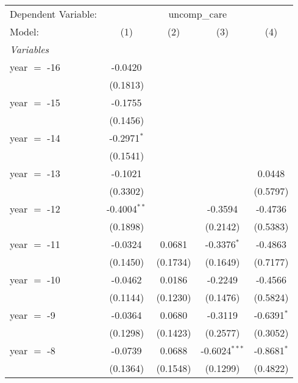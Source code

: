 
\begingroup
\centering
\begin{tabular}{lcccc}
   \tabularnewline \midrule \midrule
   Dependent Variable: & \multicolumn{4}{c}{uncomp\_care}\\
   Model:       & (1)             & (2)             & (3)             & (4)\\  
   \midrule
   \emph{Variables}\\
   year $=$ -16 & -0.0420         &                 &                 &   \\   
                & (0.1813)        &                 &                 &   \\   
   year $=$ -15 & -0.1755         &                 &                 &   \\   
                & (0.1456)        &                 &                 &   \\   
   year $=$ -14 & -0.2971$^{*}$   &                 &                 &   \\   
                & (0.1541)        &                 &                 &   \\   
   year $=$ -13 & -0.1021         &                 &                 & 0.0448\\   
                & (0.3302)        &                 &                 & (0.5797)\\   
   year $=$ -12 & -0.4004$^{**}$  &                 & -0.3594         & -0.4736\\   
                & (0.1898)        &                 & (0.2142)        & (0.5383)\\   
   year $=$ -11 & -0.0324         & 0.0681          & -0.3376$^{*}$   & -0.4863\\   
                & (0.1450)        & (0.1734)        & (0.1649)        & (0.7177)\\   
   year $=$ -10 & -0.0462         & 0.0186          & -0.2249         & -0.4566\\   
                & (0.1144)        & (0.1230)        & (0.1476)        & (0.5824)\\   
   year $=$ -9  & -0.0364         & 0.0680          & -0.3119         & -0.6391$^{*}$\\   
                & (0.1298)        & (0.1423)        & (0.2577)        & (0.3052)\\   
   year $=$ -8  & -0.0739         & 0.0688          & -0.6024$^{***}$ & -0.8681$^{*}$\\   
                & (0.1364)        & (0.1548)        & (0.1299)        & (0.4822)\\   

\end{tabular}
